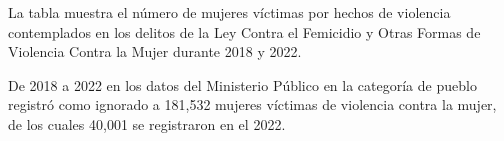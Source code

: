 La tabla muestra el número de mujeres víctimas por hechos de violencia contemplados en los delitos de la Ley Contra el Femicidio y Otras Formas de Violencia Contra la Mujer durante 2018 y 2022. 

De 2018 a 2022 en los datos del Ministerio Público en la categoría de pueblo registró como ignorado a 181,532 mujeres víctimas de violencia contra la mujer, de los cuales 40,001 se registraron en el 2022. 